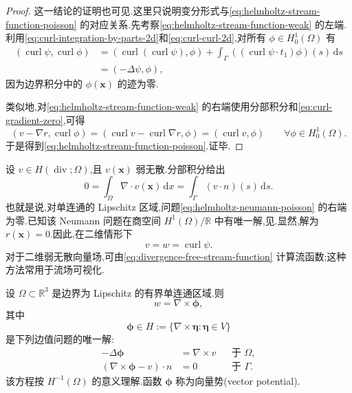 \begin{proof}
这一结论的证明也可见\textcite[第 40 页]{GiraultRaviart1986}.这里只说明变分形式与\cref{eq:helmholtz-stream-function-poisson} 的对应关系.先考察\cref{eq:helmholtz-stream-function-weak} 的左端.利用\cref{eq:curl-integration-by-parts-2d}和\cref{eq:curl-curl-2d},对所有 $\phi\in H_0^1(\Omega)$ 有
\[
\begin{aligned}
  (\operatorname{curl}\psi,\operatorname{curl}\phi)
    &=(\operatorname{curl}(\operatorname{curl}\psi),\phi)
      +\int_\Gamma
         ((\operatorname{curl}\psi\cdot t_1)\phi)(s)\,\mathrm{d}s\\
    &=(-\Delta\psi,\phi),
\end{aligned}
\]
因为边界积分中的 $\phi(\bm{x})$ 的迹为零.

类似地,对\cref{eq:helmholtz-stream-function-weak} 的右端使用分部积分和\cref{eq:curl-gradient-zero},可得
\[
  (v-\nabla r,\operatorname{curl}\phi)
    =(\operatorname{curl}v-\operatorname{curl}\nabla r,\phi)
    =(\operatorname{curl}v,\phi)
    \qquad\forall\phi\in H_0^1(\Omega).
\]
于是得到\cref{eq:helmholtz-stream-function-poisson}.证毕.
\end{proof}

\begin{note}[流函数]\label{note:stream-function}
设 $v\in H(\operatorname{div};\Omega)$,且 $v(\bm{x})$ 弱无散.分部积分给出
\[
  0=\int_\Omega\nabla\cdot v(\bm{x})\,\mathrm{d}x
    =\int_\Gamma(v\cdot n)(s)\,\mathrm{d}s.
\]
也就是说,对单连通的 Lipschitz 区域,问题\cref{eq:helmholtz-neumann-poisson} 的右端为零.已知该 Neumann 问题在商空间 $H^1(\Omega)/\mathbb{R}$ 中有唯一解,见\textcite[第 14 页]{GiraultRaviart1986}.显然,解为 $r(\bm{x})=0$.因此,在二维情形下
\begin{equation}\label{eq:divergence-free-stream-function}
  v=w=\operatorname{curl}\psi.
\end{equation}
对于二维弱无散向量场,可由\cref{eq:divergence-free-stream-function} 计算流函数;这种方法常用于流场可视化.
\end{note}

\begin{lemma}\label{lem:helmholtz-vector-potential-3d}
设 $\Omega\subset\mathbb{R}^3$ 是边界为 Lipschitz 的有界单连通区域.则
\[
  w=\nabla\times\symbf{\phi},
\]
其中
\[
  \symbf{\phi}\in H
   :=\{\nabla\times\symbf{\eta}:\symbf{\eta}\in V\}
\]
是下列边值问题的唯一解:
\[
\begin{aligned}
  -\Delta\symbf{\phi}&=\nabla\times v
       &&\text{于 }\Omega,\\
  (\nabla\times\symbf{\phi}-v)\cdot n&=0
       &&\text{于 }\Gamma.
\end{aligned}
\]
该方程按 $H^{-1}(\Omega)$ 的意义理解.函数 $\symbf{\phi}$ 称为向量势(vector potential).
\end{lemma}

